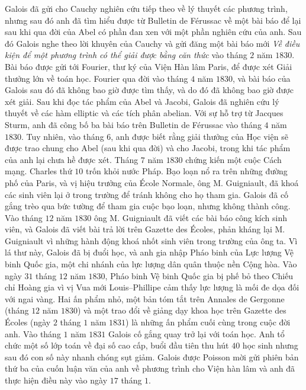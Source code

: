 \begin{multicols}{2}
	\vskip 0.1cm
	Galois đã gửi cho Cauchy nghiên cứu tiếp theo về lý thuyết  các phương trình, nhưng sau đó anh đã tìm hiểu được từ Bulletin de Férussac về một bài báo để lại sau khi qua đời của Abel có phần đan xen với một phần nghiên cứu của anh. Sau đó Galois nghe theo lời khuyên của Cauchy và gửi đăng một bài báo mới \textit{Về  điều kiện để một phương trình có thể giải được bằng căn thức} vào tháng $2$ năm $1830$. Bài báo được gửi tới Fourier, thư ký của Viện Hàn lâm Paris, để được xét Giải thưởng lớn về toán học. Fourier qua đời vào tháng $4$ năm $1830$, và bài báo của Galois sau đó đã không bao giờ được tìm thấy, và do đó đã không bao giờ được xét giải.
	\vskip 0.1cm
	Sau khi đọc tác phẩm của Abel và Jacobi, Galois đã nghiên cứu lý thuyết về các hàm elliptic và các tích phân abelian. Với sự hỗ trợ từ Jacques Sturm, anh đã công bố ba bài báo trên Bulletin de Férussac vào tháng $4$ năm $1830$. Tuy nhiên, vào tháng $6$, anh được biết rằng giải thưởng của Học viện sẽ được trao chung cho Abel (sau khi qua đời) và cho Jacobi,  trong khi tác phẩm của anh lại  chưa hề được xét.
	\vskip 0.1cm
	Tháng $7$ năm $1830$ chứng kiến một cuộc Cách mạng. Charles thứ $10$ trốn khỏi nước Pháp. Bạo loạn nổ ra trên những đường phố của Paris, và vị hiệu trưởng của École Normale, ông M. Guigniault, đã khoá  các sinh viên lại  ở trong trường  để tránh không cho họ tham gia. Galois đã cố gắng trèo qua bức tường để tham gia cuộc bạo loạn, nhưng không thành công. Vào tháng $12$ năm $1830$ ông M. Guigniault đã viết các bài báo công kích sinh viên, và Galois đã viết bài trả lời trên Gazette des Écoles, phản kháng lại M. Guigniault vì những hành động khoá nhốt sinh viên trong trường của ông ta. Vì lá thư này, Galois đã bị đuổi học,  và anh gia nhập Pháo binh của Lực lượng Vệ binh Quốc gia, một chi nhánh của lực lượng dân quân thuộc nền Cộng hòa. Vào ngày $31$ tháng $12$ năm $1830$, Pháo binh Vệ binh Quốc gia bị phế bỏ theo Chiếu chỉ Hoàng gia vì vị Vua mới Louis--Phillipe cảm thấy lực lượng là mối đe dọa đối với ngai vàng.
	\vskip 0.1cm
	Hai ấn phẩm nhỏ, một bản tóm tắt trên Annales de Gergonne (tháng $12$ năm $1830$) và một trao đổi về giảng dạy khoa học trên Gazette des Écoles (ngày $2$ tháng $1$ năm $1831$) là những ấn phẩm cuối cùng trong cuộc đời anh. Vào tháng $1$ năm $1831$ Galois cố gắng quay trở lại với toán học. Anh tổ chức một số lớp  toán về đại số cao cấp, buổi đầu tiên thu hút $40$ học sinh nhưng sau đó con số này nhanh chóng sụt giảm. Galois được Poisson mời gửi phiên bản thứ ba của cuốn luận văn của anh về phương trình cho Viện hàn lâm và anh đã thực hiện điều này vào ngày $17$ tháng $1$.

\end{multicols}
